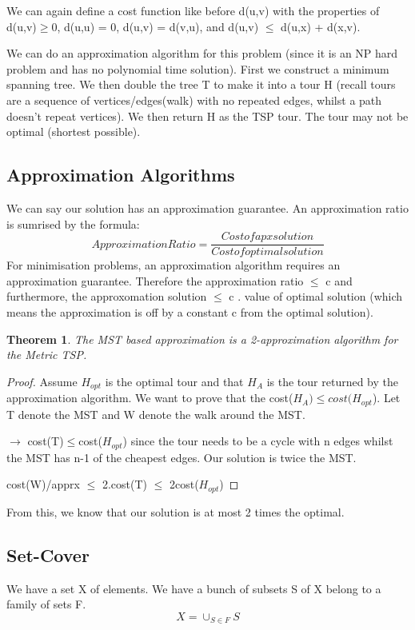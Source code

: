 \documentclass[11pt, oneside]{article}
\newtheorem{theorem}{Theorem}
\theoremstyle{definition}
\begin{document}
We can again define a cost function like before d(u,v) with the properties of d(u,v)$\geq 0$, d(u,u) = 0, d(u,v) = d(v,u), and d(u,v) $\leq$ d(u,x) + d(x,v).

We can do an approximation algorithm for this problem (since it is an NP hard problem and has no polynomial time solution). First we construct a minimum spanning tree. We then double the tree T to make it into a tour H (recall tours are a sequence of vertices/edges(walk) with no repeated edges, whilst a path doesn't repeat vertices). We then return H as the TSP tour. The tour may not be optimal (shortest possible).

\subsection{Approximation Algorithms}
We can say our solution has an approximation guarantee. An approximation ratio is sumrised by the formula:
$$
Approximation Ratio = \frac{Cost of apx solution}{Cost of optimal solution}
$$
For minimisation problems, an approximation algorithm requires an approximation guarantee. Therefore the approximation ratio $\leq$ c and furthermore, the approxomation solution $\leq$ c $.$ value of optimal solution (which means the approximation is off by a constant c from the optimal solution).

\begin{theorem}
  The MST based approximation is a 2-approximation algorithm for the Metric TSP.
\end{theorem}
\begin{proof}
  Assume $H_{opt}$ is the optimal tour and that $H_A$ is the tour returned by the approximation algorithm. We want to prove that the cost($H_A) \leq cost(H_{opt}$). Let T denote the MST and W denote the walk around the MST.

  $\rightarrow$ cost(T)$\leq$cost($H_{opt}$) since the tour needs to be a cycle with n edges whilst the MST has n-1 of the cheapest edges. Our solution is twice the MST.

  cost(W)/apprx $\leq$ 2.cost(T) $\leq$ 2cost($H_{opt}$)
\end{proof}

From this, we know that our solution is at most 2 times the optimal.

\subsection{Set-Cover}
We have a set X of elements. We have a bunch of subsets S of X belong to a family of sets F.
$$
X = \cup_{S \in F}S
$$
\end{document}
